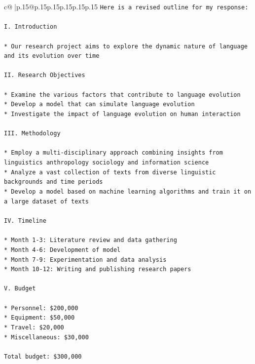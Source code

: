 \documentclass{article}
\begin{document}
{\begin{supertabular}{c@{$\;$}|p{.15\linewidth}@{}p{.15\linewidth}p{.15\linewidth}p{.15\linewidth}p{.15\linewidth}p{.15\linewidth}}
{{{\texttt{Here is a revised outline for my response:} \\
\\ 
\texttt{I. Introduction} \\
\\ 
\texttt{* Our research project aims to explore the dynamic nature of language and its evolution over time} \\
\\ 
\texttt{II. Research Objectives} \\
\\ 
\texttt{* Examine the various factors that contribute to language evolution} \\
\texttt{* Develop a model that can simulate language evolution} \\
\texttt{* Investigate the impact of language evolution on human interaction} \\
\\ 
\texttt{III. Methodology} \\
\\ 
\texttt{* Employ a multi{-}disciplinary approach combining insights from linguistics anthropology sociology and information science} \\
\texttt{* Analyze a vast collection of texts from diverse linguistic backgrounds and time periods} \\
\texttt{* Develop a model based on machine learning algorithms and train it on a large dataset of texts} \\
\\ 
\texttt{IV. Timeline} \\
\\ 
\texttt{* Month 1{-}3: Literature review and data gathering} \\
\texttt{* Month 4{-}6: Development of model} \\
\texttt{* Month 7{-}9: Experimentation and data analysis} \\
\texttt{* Month 10{-}12: Writing and publishing research papers} \\
\\ 
\texttt{V. Budget} \\
\\ 
\texttt{* Personnel: \$200,000} \\
\texttt{* Equipment: \$50,000} \\
\texttt{* Travel: \$20,000} \\
\texttt{* Miscellaneous: \$30,000} \\
\\ 
\texttt{Total budget: \$300,000} \\
}}}
\end{supertabular}}
\end{document}
